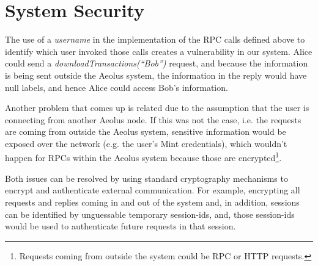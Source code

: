 \section{System Security}

The use of a \emph{username} in the implementation of the RPC calls defined above to identify which user invoked those calls creates a vulnerability in our system. Alice could send a \emph{downloadTransactions(``Bob'')} request, and because the information is being sent outside the Aeolus system, the information in the reply would have null labels, and hence Alice could access Bob's information.

Another problem that comes up is related due to the assumption that the user is connecting from another Aeolus node. If this was not the case, i.e. the requests are coming from outside the Aeolus system, sensitive information would be exposed over the network (e.g. the user's Mint credentials), which wouldn't happen for RPCs within the Aeolus system because those are encrypted\footnote{Requests coming from outside the system could be RPC or HTTP requests.}.

Both issues can be resolved by using standard cryptography mechanisms to encrypt and authenticate external communication. For example, encrypting all requests and replies coming in and out of the system and, in addition, sessions can be identified by unguessable temporary session-ids, and, those session-ids would be used to authenticate future requests in that session.

